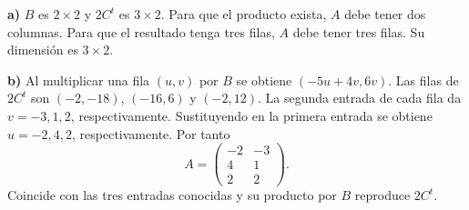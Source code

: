 \textbf{a)} $B$ es $2\times2$ y $2C^t$ es $3\times2$.
Para que el producto exista, $A$ debe tener dos columnas.
Para que el resultado tenga tres filas, $A$ debe tener tres filas.
Su dimensión es $\boxed{3\times2}$.

\textbf{b)} Al multiplicar una fila $(u,v)$ por $B$ se obtiene
$(-5u+4v,6v)$. Las filas de $2C^t$ son $(-2,-18)$,
$(-16,6)$ y $(-2,12)$. La segunda entrada de cada fila
da $v=-3,1,2$, respectivamente. Sustituyendo en la primera
entrada se obtiene $u=-2,4,2$, respectivamente. Por tanto
\[
A=\boxed{\begin{pmatrix}-2&-3\\4&1\\2&2\end{pmatrix}}.
\]
Coincide con las tres entradas conocidas y su producto por $B$
reproduce $2C^t$.
